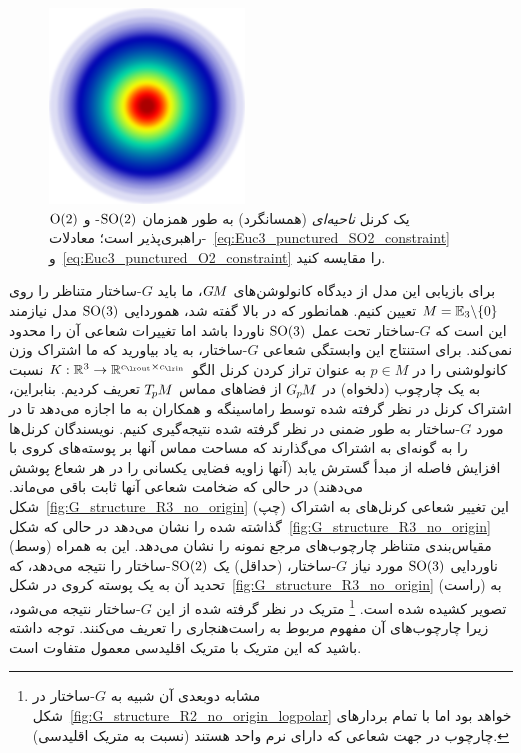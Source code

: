 \begin{figure}
	\vspace*{-3.ex}
	\centering
	\includegraphics[width=.8\linewidth]{figures/invariant_kernel.png}%
	\caption{\small
		یک کرنل \emph{ناحیه‌ای} (همسانگرد) به طور همزمان $\operatorname{SO}(2)$- و $\operatorname{O}(2)$-راهبری‌پذیر است؛
		معادلات~\eqref{eq:Euc3_punctured_SO2_constraint} و~\eqref{eq:Euc3_punctured_O2_constraint} را مقایسه کنید.
	}
	\label{fig:zonal_kernel}
\end{figure}%
برای بازیابی این مدل از دیدگاه کانولوشن‌های $G\mkern-1.4muM$، ما باید $G$-ساختار متناظر را روی $M = \mathbb{E}_3 \backslash \{0\}$ تعیین کنیم.
همانطور که در بالا گفته شد، هموردایی $\operatorname{SO}(3)$ مدل نیازمند این است که $G$-ساختار تحت عمل $\operatorname{SO}(3)$ ناوردا باشد اما تغییرات شعاعی آن را محدود نمی‌کند.
برای استنتاج این وابستگی شعاعی $G$-ساختار، به یاد بیاورید که ما اشتراک وزن کانولوشنی را در $p\in M$ به عنوان تراز کردن کرنل الگو $K: \R^3 \to \R^{\cout\times\cin}$ نسبت به یک چارچوب (دلخواه) در $G_{\mkern-1.3mu p}\mkern-1.2muM$ از فضاهای مماس $T_{\mkern-1.5mu p}\mkern-.5muM$ تعریف کردیم.
بنابراین، اشتراک کرنل در نظر گرفته شده توسط راماسینگه و همکاران \cite{ramasinghe2019representation} به ما اجازه می‌دهد تا در مورد $G$-ساختار به طور ضمنی در نظر گرفته شده نتیجه‌گیری کنیم.
نویسندگان کرنل‌ها را به گونه‌ای به اشتراک می‌گذارند که مساحت مماس آنها بر پوسته‌های کروی با افزایش فاصله از مبدأ گسترش یابد (آنها زاویه فضایی یکسانی را در هر شعاع پوشش می‌دهند) در حالی که ضخامت شعاعی آنها ثابت باقی می‌ماند.
شکل~\ref{fig:G_structure_R3_no_origin} (چپ) این تغییر شعاعی کرنل‌های به اشتراک گذاشته شده را نشان می‌دهد در حالی که
شکل~\ref{fig:G_structure_R3_no_origin} (وسط) مقیاس‌بندی متناظر چارچوب‌های مرجع نمونه را نشان می‌دهد.
این به همراه ناوردایی $\operatorname{SO}(3)$ مورد نیاز $G$-ساختار، (حداقل) یک $\operatorname{SO}(2)$-ساختار را نتیجه می‌دهد، که تحدید آن به یک پوسته کروی در شکل~\ref{fig:G_structure_R3_no_origin} (راست) به تصویر کشیده شده است.%
\footnote{
	مشابه دوبعدی آن شبیه به $G$-ساختار در شکل~\ref{fig:G_structure_R2_no_origin_logpolar} خواهد بود اما با تمام بردارهای چارچوب در جهت شعاعی که دارای نرم واحد هستند (نسبت به متریک اقلیدسی).
}
متریک در نظر گرفته شده از این $G$-ساختار نتیجه می‌شود، زیرا چارچوب‌های آن مفهوم مربوط به راست‌هنجاری را تعریف می‌کنند.
توجه داشته باشید که این متریک با متریک اقلیدسی معمول متفاوت است.


